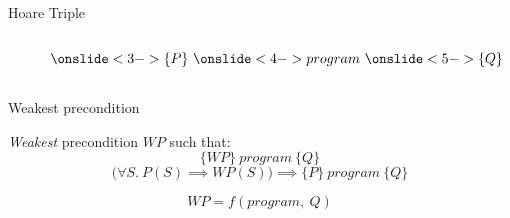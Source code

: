 \documentclass[xcolor={x11names}]{beamer}
\newcommand{\htriple}[3]{\ensuremath{\{#1\}~#2~\{#3\}}}
\newcommand{\WP}{\ensuremath{\mathit{WP}}}
\begin{document}
\begin{frame}{Hoare Triple}
{\begin{columns}
\begin{column}{.5\textwidth}
\begin{center}
                \end{center}
            \end{column}
            \begin{column}{.5\textwidth}
                \begin{center}
                    \begin{equation*}
                        \onslide<3->{\{P\}} ~ \onslide<4->{program} ~ \onslide<5->{\{Q\}}
                    \end{equation*}
                    \bigskip
                \end{center}
            \end{column}
        \end{columns}
    }
\end{frame}

\begin{frame}{Weakest precondition}
    \begin{center}
        \textit{Weakest} precondition $WP$ such that:
        \begin{equation*}
            \htriple{WP}{program}{Q}
        \end{equation*}
        \pause
        \begin{equation*}
            \Big(\forall S.~P(S) \implies WP(S)\Big) \implies \htriple{P}{program}{Q}
        \end{equation*}

        \bigskip
        \pause

        \begin{equation*}
            \WP = f(program,~Q)
        \end{equation*}
    \end{center}
\end{frame}
\end{document}
